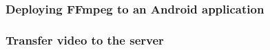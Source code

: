 \subsubsection{Deploying FFmpeg to an Android application}

\subsubsection{Transfer video to the server}
